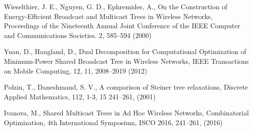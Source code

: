 \begin{thebibliography}{}
%
%
Wieselthier,  J. E., Nguyen, G. D., Ephremides, A.,
On the Construction of Energy-Efficient Broadcast and Multicast Trees in Wireless Networks,
Proceedings of the Nineteenth Annual Joint Conference of the IEEE Computer and Communications Societies.
2, 585--594 (2000)

Yuan, D., Haugland, D.,
Dual Decomposition for Computational Optimization of Minimum-Power Shared Broadcast Tree in Wireless Networks,
IEEE Transactions on Mobile Computing,
12, 11, 2008--2019 (2012)

Polzin, T., Daneshmand, S. V., A comparison of Steiner tree relaxations, Discrete Applied Mathematics, 112,  1-3, 15 241--261, (2001)

Ivanova, M., Shared Multicast Trees in Ad Hoc Wireless Networks, Combinatorial Optimization, 4th International Symposium, ISCO 2016, 241--261, (2016)
\end{thebibliography}



